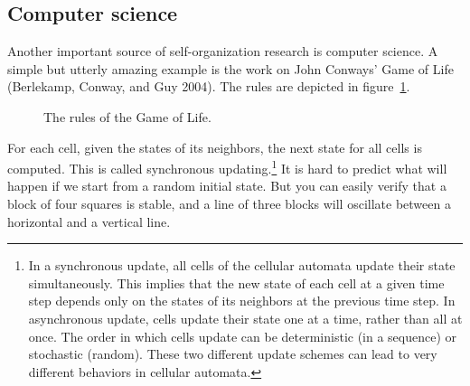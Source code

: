 \documentclass[
  a4paper,
  DIV=11,
  numbers=noendperiod,
  oneside]{scrreprt}
\begin{document}
\subsection{Computer science}\label{sec-Computer-science}

Another important source of self-organization research is computer
science. A simple but utterly amazing example is the work on John
Conways' Game of Life (Berlekamp, Conway, and Guy 2004). The rules are
depicted in figure~\ref{fig-ch5n-img3-old-41}.

\begin{figure}


\caption{\label{fig-ch5n-img3-old-41}The rules of the Game of Life.}

\end{figure}%

For each cell, given the states of its neighbors, the next state for all
cells is computed. This is called synchronous updating.\footnote{In a
  synchronous update, all cells of the cellular automata update their
  state simultaneously. This implies that the new state of each cell at
  a given time step depends only on the states of its neighbors at the
  previous time step. In asynchronous update, cells update their state
  one at a time, rather than all at once. The order in which cells
  update can be deterministic (in a sequence) or stochastic (random).
  These two different update schemes can lead to very different
  behaviors in cellular automata.} It is hard to predict what will
happen if we start from a random initial state. But you can easily
verify that a block of four squares is stable, and a line of three
blocks will oscillate between a horizontal and a vertical line.
\end{document}
